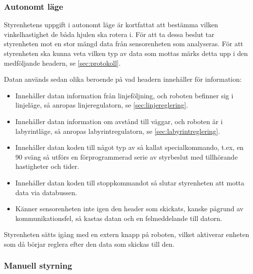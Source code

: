 \subsubsection{Autonomt läge}

Styrenhetens uppgift i autonomt läge är kortfattat att bestämma vilken vinkelhastighet de båda hjulen ska rotera i. 
För att ta dessa beslut tar styrenheten mot en stor mängd data från sensorenheten som analyseras.
För att styrenheten ska kunna veta vilken typ av data som mottas märks detta upp i den
medföljande headern, se \ref{sec:protokoll}. 

Datan används sedan olika beroende på vad headern innehåller för information:
 
 \begin{itemize}
 
\item Innehåller datan information från linjeföljning, och roboten befinner sig i linjeläge, 
så anropas linjeregulatorn, se \ref{sec:linjereglering}.

\item Innehåller datan information om avstånd till väggar, och roboten är i labyrintläge,
 så anropas labyrintregulatorn, se \ref{sec:labyrintreglering}.

\item Innehåller datan koden till något typ av så kallat specialkommando, t.ex, en 90\degree 
sväng så utförs en förprogrammerad serie av styrbeslut med tillhörande hastigheter och tider.

\item Innehåller datan koden till stoppkommandot så slutar styrenheten att motta data via databussen.

\item Känner sensorenheten inte igen den header som skickats, kanske pågrund av kommunikationsfel,
så kastas datan och en felmeddelande till datorn.

\end{itemize}

Styrenheten sätts igång med en extern knapp på roboten, vilket aktiverar enheten som då börjar
reglera efter den data som skickas till den.

\subsubsection{Manuell styrning}

